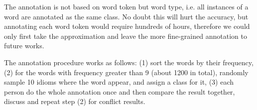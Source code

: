The annotation is not based on word token but word type, i.e. all instances of a word are annotated as the same class. No doubt this will hurt the accuracy, but annotating each word token would require hundreds of hours, therefore we could only first take the approximation and leave the more fine-grained annotation to future works.

The annotation procedure works as follows: (1) sort the words by their frequency, (2) for the words with frequency greater than 9 (about 1200 in total), randomly sample 10 idioms where the word appear, and assign a class for it, (3) each person do the whole annotation once and then compare the result together, discuss and repeat step (2) for conflict results.

